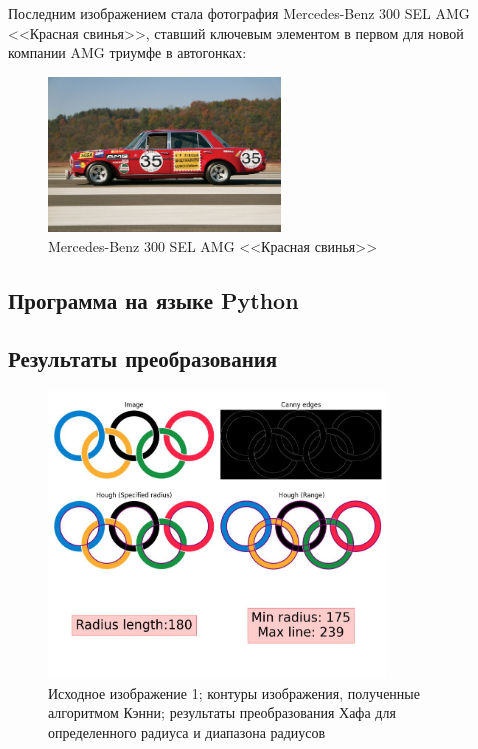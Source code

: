 Последним изображением стала фотография Mercedes-Benz 300 SEL AMG <<Красная свинья>>, ставший ключевым элементом в первом для новой компании AMG триумфе в автогонках:
\begin{figure}[ht!]
    \centering
    \includegraphics[width=0.55\textwidth]{images/circles/source/Mercedes 300 SEL 6.8 AMG red pig.jpg}
    \caption{ Mercedes-Benz 300 SEL AMG <<Красная свинья>>}
    \label{img:mr_logo}
\end{figure} 

\subsection{Программа на языке Python}

\subsection{Результаты преобразования}

\begin{figure}[ht!]
    \centering
    \includegraphics[width=0.8\textwidth]{images/circles/olympics.jpg}
    \caption{Исходное изображение 1; контуры изображения, полученные алгоритмом Кэнни; результаты преобразования Хафа для определенного радиуса и диапазона радиусов}
    \label{img:fin_ol}
\end{figure}

